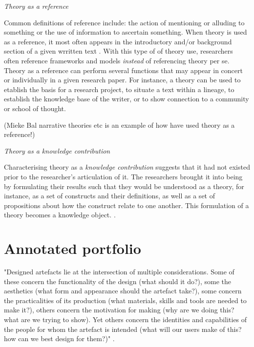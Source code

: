 \par \emph{Theory as a reference} \par
Common definitions of reference include: the action of mentioning or alluding to something or the use of information to ascertain something. When theory is used as a reference, it most often appears in the introductory and/or background section of a given wrritten text \autocite[p. 128]{beck_examining_2016}. With this type of of theory use, researchers often reference frameworks and models \emph{instead} of referencing theory per se. Theory as a reference can perform several functions that may appear in concert or individually in a given research paper. For instance, a theory can be used to etablish the basis for a research project, to situate a text within a lineage, to establish the knowledge base of the writer, or to show connection to a community or school of thought. 
\par

(Mieke Bal narrative theories etc is an example of how  have used theory as a reference!)

\par \emph{Theory as a knowledge contribution} \par
Characterising theory as a \emph{knowledge contribution} suggests that it had not existed prior to the researcher's articulation of it. The researchers brought it into being by formulating their results such that they would be understood as a theory, for instance, as a set of constructs and their definitions, as well as a set of propositions about how the construct relate to one another. This formulation of a theory becomes a knowledge object. \autocite[p. 128]{beck_examining_2016}.




\section{Annotated portfolio}

"Designed artefacts lie at the intersection of multiple considerations. Some of these concern the functionality of the design (what should it do?), some the aesthetics (what form and appearance should the artefact take?), some concern the practicalities of its production (what materials, skills and tools are needed to make it?), others concern the motivation for making (why are we doing this? what are we trying to show). Yet others concern the identities and capabilities of the people for whom the artefact is intended (what will our users make of this? how can we best design for them?)" \autocite[p. 70]{bowers_annotated_2012}. 

